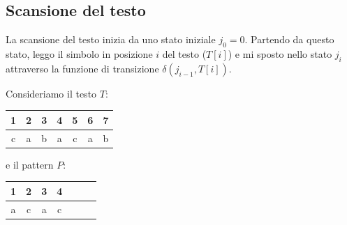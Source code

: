 \subsection{Scansione del testo}
La scansione del testo inizia da uno stato iniziale $j_0 = 0$. Partendo da questo
stato, leggo il simbolo in posizione $i$ del testo ($T[i]$) e mi sposto nello stato
$j_i$ attraverso la funzione di transizione $\delta(j_{i - 1}, T[i])$.
\begin{esempio}
    Consideriamo il testo $T$:
    \begin{table}[!ht]
        \centering
        \begin{tabular}{ccccccc}
            1                       & 2                      & 3
                                    & 4                      & 5
                                    & 6                      & 7 \\ \hline
            \multicolumn{1}{|c|}{c} & \multicolumn{1}{c|}{a} &
            \multicolumn{1}{c|}{b}  & \multicolumn{1}{c|}{a} &
            \multicolumn{1}{c|}{c}  & \multicolumn{1}{c|}{a} &
            \multicolumn{1}{c|}{b}                               \\ \hline
        \end{tabular}
    \end{table}

    e il pattern $P$:
    \begin{table}[!ht]
        \centering
        \begin{tabular}{ccccccc}
            1                       & 2                      & 3
                                    & 4                          \\ \hline
            \multicolumn{1}{|c|}{a} & \multicolumn{1}{c|}{c} &
            \multicolumn{1}{c|}{a}  & \multicolumn{1}{c|}{c}     \\ \hline
        \end{tabular}
    \end{table}


\end{esempio}
